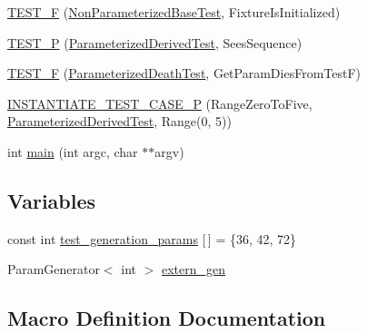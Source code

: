 \begin{DoxyCompactItemize}
\item 
\mbox{\hyperlink{googletest-param-test-test_8cc_af8865fa8411285bd2492b5105f35a7de}{T\+E\+S\+T\+\_\+F}} (\mbox{\hyperlink{classNonParameterizedBaseTest}{Non\+Parameterized\+Base\+Test}}, Fixture\+Is\+Initialized)
\item 
\mbox{\hyperlink{googletest-param-test-test_8cc_a92492aa8cc7fda6eb6438c6f7c74e478}{T\+E\+S\+T\+\_\+P}} (\mbox{\hyperlink{classParameterizedDerivedTest}{Parameterized\+Derived\+Test}}, Sees\+Sequence)
\item 
\mbox{\hyperlink{googletest-param-test-test_8cc_a0eb7e27c6505d446a1bc3e4fe856a6b2}{T\+E\+S\+T\+\_\+F}} (\mbox{\hyperlink{classParameterizedDeathTest}{Parameterized\+Death\+Test}}, Get\+Param\+Dies\+From\+TestF)
\item 
\mbox{\hyperlink{googletest-param-test-test_8cc_a95c681268169eb0c79f4578ce1645957}{I\+N\+S\+T\+A\+N\+T\+I\+A\+T\+E\+\_\+\+T\+E\+S\+T\+\_\+\+C\+A\+S\+E\+\_\+P}} (Range\+Zero\+To\+Five, \mbox{\hyperlink{classParameterizedDerivedTest}{Parameterized\+Derived\+Test}}, Range(0, 5))
\item 
int \mbox{\hyperlink{googletest-param-test-test_8cc_a3c04138a5bfe5d72780bb7e82a18e627}{main}} (int argc, char $\ast$$\ast$argv)
\end{DoxyCompactItemize}
\subsection*{Variables}
\begin{DoxyCompactItemize}
\item 
const int \mbox{\hyperlink{googletest-param-test-test_8cc_aefe5c7eafc17e71cec010d92628bf84f}{test\+\_\+generation\+\_\+params}} \mbox{[}$\,$\mbox{]} = \{36, 42, 72\}
\item 
Param\+Generator$<$ int $>$ \mbox{\hyperlink{googletest-param-test-test_8cc_a0f691f1461778d71f30b1fb1dea1cb50}{extern\+\_\+gen}}
\end{DoxyCompactItemize}


\subsection{Macro Definition Documentation}
\mbox{\label{googletest-param-test-test_8cc_a6414de581a925e7399b27c14e38f8a67}} 

